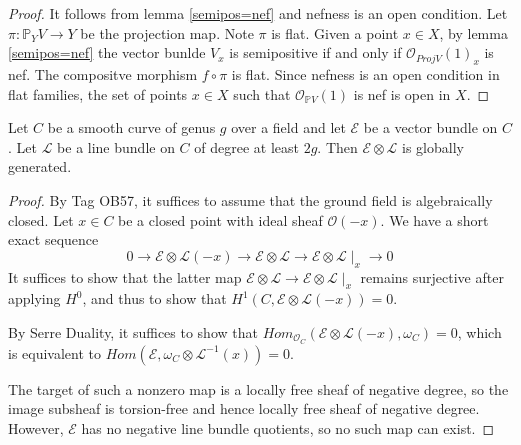 \begin{proof}
It follows from lemma \ref{semipos=nef} and nefness is an open condition.
Let $\pi:\mathbb{P}_YV\to Y$ be the projection map.  Note $\pi$ is flat. Given a point $x\in X$, by lemma \ref{semipos=nef} the vector bunlde $V_x$ is semipositive if and only if $\mathcal{O}_{Proj V}(1)_x$ is nef. The compositve morphism $f\circ \pi$ is flat. Since nefness is an open condition in flat families, the set of points $x\in X$ such that $\mathcal{O}_{\mathbb{P}V}(1)$ is nef is open in $X$.
\end{proof}

\begin{lemma}\label{global_generation_of_twist_on_curve}
Let $C$ be a smooth curve of genus $g$ over a field and let $\mathcal{E}$ be a vector bundle on $C$. 
Let $\mathcal{L}$ be a line bundle on $C$ of degree at least $2g$. 
Then $\mathcal{E}\otimes\mathcal{L}$ is globally generated.
\end{lemma}

\begin{proof}
By Tag OB57, it suffices to assume that the ground field is algebraically closed. 
Let $x\in C$ be a closed point with ideal sheaf $\mathcal{O}(-x)$. 
We have a short exact sequence
\begin{equation}
0\to\mathcal{E}\otimes\mathcal{L}(-x)\to\mathcal{E}\otimes\mathcal{L}\to\mathcal{E}\otimes\mathcal{L}\mid_x\to0
\end{equation}
It suffices to show that the latter map $\mathcal{E}\otimes\mathcal{L}\to\mathcal{E}\otimes\mathcal{L}\mid_x$ remains surjective after applying $H^0$, and thus to show that $H^1(C,\mathcal{E}\otimes\mathcal{L}(-x))=0$.

By Serre Duality, it suffices to show that $Hom_{\mathcal{O}_C}(\mathcal{E}\otimes\mathcal{L}(-x),\omega_C)=0$, which is equivalent to $Hom(\mathcal{E},\omega_C\otimes\mathcal{L}^{-1}(x))=0$.

The target of such a nonzero map is a locally free sheaf of negative degree, so the image subsheaf is torsion-free and hence locally free sheaf of negative degree. However, $\mathcal{E}$ has no negative line bundle quotients, so no such map can exist.
\end{proof}



